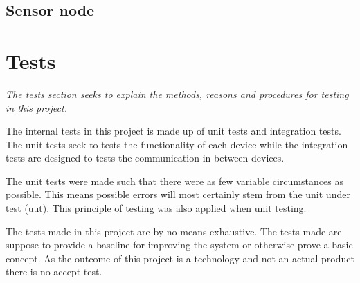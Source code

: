 \subsection{Sensor node}


\section{Tests}
\textit{The tests section seeks to explain the methods, reasons and procedures for testing in this project.}

The internal tests in this project is made up of unit tests and integration tests. The unit tests seek to tests the functionality of each device while the integration tests are designed to tests the communication in between devices.

The unit tests were made such that there were as few variable circumstances as possible. This means possible errors will most certainly stem from the unit under test (uut). This principle of testing was also applied when unit testing.

The tests made in this project are by no means exhaustive. The tests made are suppose to provide a baseline for improving the system or otherwise prove a basic concept. As the outcome of this project is a technology and not an actual product there is no accept-test.

